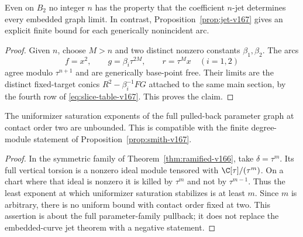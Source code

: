 \begin{corollary}
\label{cor:no-uniform-v167}
Even on $B_2$ no integer $n$ has the property that the coefficient
$n$-jet determines every embedded graph limit. In contrast,
Proposition~\ref{prop:jet-v167} gives an explicit finite bound for
each generically nonincident arc.
\end{corollary}
\begin{proof}
Given $n$, choose $M>n$ and two distinct nonzero constants
$\beta_1,\beta_2$. The arcs
\[
 f=x^2,\qquad g=\beta_i\tau^{2M},\qquad r=\tau^M x
 \quad(i=1,2)
\]
agree modulo $\tau^{n+1}$ and are generically base-point free.
Their limits are the distinct fixed-target conics
$R^2-\beta_i^{-1}FG$ attached to the same main section, by the
fourth row of \eqref{eq:slice-table-v167}. This proves the claim.
\end{proof}

\begin{proposition}
\label{prop:no-saturation-bound-v167}
The uniformizer saturation exponents of the full pulled-back
parameter graph at contact order two are unbounded. This is
compatible with the finite degree-module statement of
Proposition~\ref{prop:smith-v167}.
\end{proposition}
\begin{proof}
In the symmetric family of Theorem~\ref{thm:ramified-v166}, take
$\delta=\tau^m$. Its full vertical torsion is a nonzero ideal
module tensored with $\C[\tau]/(\tau^m)$. On a chart where that
ideal is nonzero it is killed by $\tau^m$ and not by
$\tau^{m-1}$. Thus the least exponent at which uniformizer
saturation stabilizes is at least $m$. Since $m$ is arbitrary,
there is no uniform bound with contact order fixed at two.
This assertion is about the full parameter-family pullback; it
does not replace the embedded-curve jet theorem with a negative
statement.
\end{proof}
